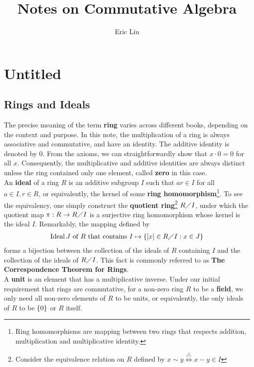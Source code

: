 \documentclass{report}
\title{Notes on Commutative Algebra}
\author{Eric Liu}
\date{}
\begin{document}
\maketitle
\newpage%

\tableofcontents
\pagebreak
\chapter{Untitled} 
\section{Rings and Ideals}
The precise meaning of the term \textbf{ring} varies across different books, depending on the context and purpose. In this note, the multiplication of a ring is always associative and commutative, and have an identity. The additive identity is denoted by $0$. From the axioms, we can straightforwardly show that $x\cdot 0 = 0$ for all $x$. Consequently, the multiplicative and additive identities are always distinct unless the ring contained only one element, called  \textbf{zero} in this case.\\

An \textbf{ideal} of a ring $R$ is an additive subgroup $I$ such that $ar \in I$ for all $a \in I,  r \in R$, or equivalently, the kernel of some \textbf{ring homomorphism}\footnote{Ring homomorphisms are mapping between two rings that respects addition, multiplication and  multiplicative identity.}. To see the equivalency, one simply construct the \textbf{quotient ring}\footnote{Consider the equivalence relation on $R$ defined by  $x\sim  y\overset{\triangle}{\iff } x-y \in I$} $R\diagup I$, under which the quotient map $\pi: R \rightarrow R \diagup  I$ is a surjective ring homomorphism whose kernel is the ideal $I$. Remarkably, the mapping defined by 
 \begin{align*}
\operatorname{Ideal }J\text{ of $R$ that contains }I \mapsto \{ [x]\in R\diagup I: x\in J \}
\end{align*}
forms a bijection between the collection of the ideals of $R$ containing  $I$ and the collection of the ideals of $R\diagup I$. This fact is commonly referred to as \textbf{The Correspondence Theorem for Rings}. \\

A \textbf{unit} is an element that has a multiplicative inverse. Under our initial requirement that rings are commutative, for a non-zero ring $R$ to be a \textbf{field}, we only need all non-zero elements of $R$ to be units, or equivalently, the only ideals of $R$ to be $\{ 0 \}$ or $R$ itself.\\
\end{document}
